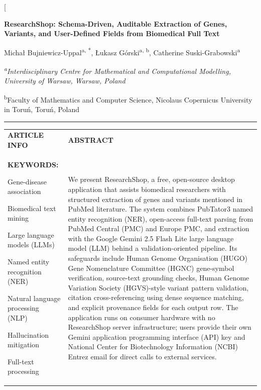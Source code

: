 \documentclass[final,5p,times,twocolumn]{elsarticle}
\newcommand{\frontlabel}[1]{\textbf{\MakeUppercase{#1}}}
\newcommand{\frontspaced}[1]{\textbf{\MakeUppercase{#1}}}
\begin{document}
\makeatletter
\twocolumn[
\begin{@twocolumnfalse}
\vspace*{-0.7cm}
{\Large\bfseries ResearchShop: Schema-Driven, Auditable Extraction of Genes, Variants, and User-Defined Fields from Biomedical Full Text\par}
\vspace{0.45em}
{\normalsize Micha{\l} Bujniewicz-Uppal\textsuperscript{a, *}, {\L}ukasz G\'{o}rski\textsuperscript{a, b}, Catherine Suski-Grabowski\textsuperscript{a}\par}
\vspace{0.25em}
{\footnotesize\itshape \textsuperscript{a}Interdisciplinary Centre for Mathematical and Computational Modelling, University of Warsaw, Warsaw, Poland\par
\textsuperscript{b}Faculty of Mathematics and Computer Science, Nicolaus Copernicus University in Toruń, Toruń, Poland\par}
\vspace{0.9em}
\hrule
\vspace{0.75em}
\noindent
{\footnotesize
\begin{tabularx}{\textwidth}{>{\raggedright\arraybackslash}p{} >{\raggedright\arraybackslash}X}
\frontspaced{Article Info} &
\frontspaced{Abstract} \\
\addlinespace[0.4em]
\frontlabel{Keywords:}\par
Gene-disease association\par
Biomedical text mining\par
Large language models (LLMs)\par
Named entity recognition (NER)\par
Natural language processing (NLP)\par
Hallucination mitigation\par
Full-text processing
&
We present ResearchShop, a free, open-source desktop application that assists biomedical researchers with structured extraction of genes and variants mentioned in PubMed literature. The system combines PubTator3 named entity recognition (NER), open-access full-text parsing from PubMed Central (PMC) and Europe PMC, and extraction with the Google Gemini 2.5 Flash Lite large language model (LLM) behind a validation-oriented pipeline. Its safeguards include Human Genome Organisation (HUGO) Gene Nomenclature Committee (HGNC) gene-symbol verification, source-text grounding checks, Human Genome Variation Society (HGVS)-style variant pattern validation, citation cross-referencing using dense sequence matching, and explicit provenance fields for each output row. The application runs on consumer hardware with no ResearchShop server infrastructure; users provide their own Gemini application programming interface (API) key and National Center for Biotechnology Information (NCBI) Entrez email for direct calls to external services.


\end{tabularx}}
\end{@twocolumnfalse}
\end{document}
